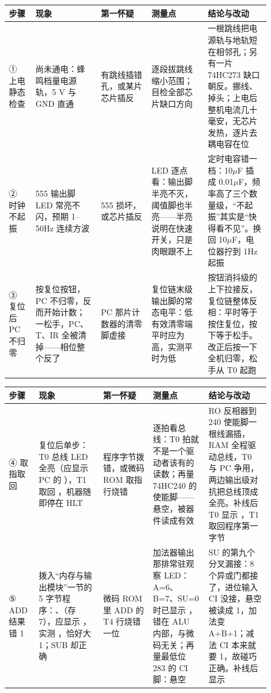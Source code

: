 \begin{longtable}{L{0.09\linewidth}L{0.22\linewidth}L{0.17\linewidth}L{0.19\linewidth}L{0.21\linewidth}}
\toprule
步骤 & 现象 & 第一怀疑 & 测量点 & 结论与改动 \\
\midrule
① 上电静态检查 & 尚未通电：蜂鸣档量电源轨，5 V 与 GND 直通 & 有跳线插错孔，或某片芯片插反 & 逐段拔跳线缩小范围；目检全部芯片缺口方向 & 一根跳线把电源轨与地轨短在相邻孔；另有一片 74HC273 缺口朝反。挪线、掉头；上电后整机电流几十毫安，无芯片发热，逐片去耦电容在位 \\\tablerowrule
② 时钟不起振 & 555 输出脚 LED 常亮不闪，预期 1--50Hz 连续方波 & 555 损坏，或芯片插反 & LED 逐点看：输出脚半亮不灭，阈值脚也半亮——半亮说明在快速开关，只是肉眼跟不上 & 定时电容错一档：10$\mu$F 插成 0.01$\mu$F，频率高了三个数量级，“不起振”其实是“快得看不见”。换回 10$\mu$F，电位器拧到 1Hz 起振 \\\tablerowrule
③ 复位后 PC 不归零 & 按复位按钮，PC 不归零，反而开始计数；一松手，PC、T、IR 全被清掉——相位整个反了 & PC 那片计数器的清零脚虚接 & 复位链末级输出脚的常态电平：低有效清零端平时应为高，实测平时为低 & 按钮消抖级的上下拉接反，复位链整体反相：平时等于按住复位，按下等于松手。改正后按一下全机归零，松手从 T0 起跑 \\
\bottomrule
\end{longtable}

\begin{longtable}{L{0.09\linewidth}L{0.22\linewidth}L{0.17\linewidth}L{0.19\linewidth}L{0.21\linewidth}}
\toprule
步骤 & 现象 & 第一怀疑 & 测量点 & 结论与改动 \\
\midrule
④ 取指取回  & 复位后单步：T0 总线 LED 全亮（应显示 PC 的 ），T1 取回 ，机器随即停在 HLT & 程序字节拨错，或微码 ROM 取指行烧错 & 逐拍看总线：T0 拍就不是一个驱动者该有的读数；再量 74HC240 的使能脚——悬空，被器件读成有效 & RO 反相器到 240 使能脚一根线漏插，RAM 全程驱动总线，T0 与 PC 争用，两边输出级对抗把总线顶成全亮。补线后 T0 显示 ，T1 取回程序第一字节 \\\tablerowrule
⑤ ADD 结果错 1 & 拨入“内存与输出模块”一节的 5 字节程序：、（存 7），应显示 ，实测 ，恰好大 1；SUB 却正确 & 微码 ROM 里 ADD 的 T4 行烧错一位 & 加法器输出那排常驻观察 LED：A=6、B=7、SU=0 时已显示 ，错在 ALU 内部，与微码无关；再量最低位 283 的 CI 脚：悬空 & SU 的第九个分叉漏接：8 个异或门都接了，进位输入 CI 没接，悬空被读成 1，加法变 A+B+1；减法 CI 本来就要 1，故碰巧正确。补线后显示  \\
\bottomrule
\end{longtable}


